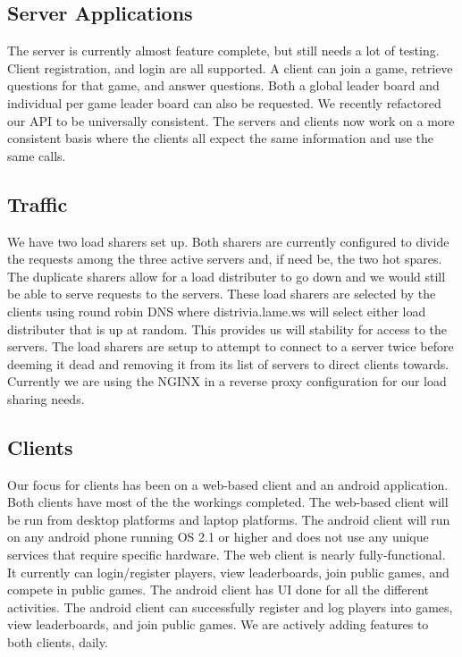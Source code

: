 \documentclass{dependencies/acm_proc_article-sp}
\begin{document}
\subsection {Server Applications}
The server is currently almost feature complete, but still needs a lot of
testing. Client registration, and login are all supported. A client can
join a game, retrieve questions for that game, and answer questions. Both a
global leader board and individual per game leader board can also be requested. We recently refactored our API to be universally consistent. The servers and clients now work on a more consistent basis where the clients all expect the same information and use the same calls.

\subsection {Traffic}
We have two load sharers set up. Both sharers are currently configured to
divide the requests among the three active servers and, if need be, the two hot spares. The duplicate sharers allow
for a load distributer to go down and we would still be able to serve requests
to the servers. These load sharers are selected by the clients using round
robin DNS where distrivia.lame.ws will select either load distributer that is
up at random. This provides us will stability for access to the servers. The
load sharers are setup to attempt to connect to a server twice before
deeming it dead and removing it from its list of servers to direct clients towards.
Currently we are using the NGINX \cite{nginx} in a reverse proxy configuration
for our load sharing needs.

\subsection {Clients}
Our focus for clients has been on a web-based client and an android application.
Both clients have most of the the workings completed. The web-based client will
be run from desktop platforms and laptop platforms. The android client will run
on any android phone running OS 2.1 or higher and does not use any unique services that require specific
hardware. The web client is nearly fully-functional. It currently can login/register
players, view leaderboards, join public games, and compete in public games. The android client has UI done for all the different activities. The android client can successfully register
and log players into games, view leaderboards, and join public games. We are actively adding features to both clients, daily.
\end{document}
